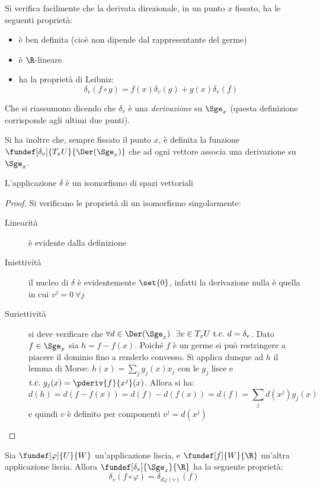 \begin{oss}
Si verifica facilmente che la derivata direzionale, in un punto $x$ fissato, ha le seguenti proprietà:
\begin{itemize}
\item è ben definita (cioè non dipende dal rappresentante del germe)
\item è $\R$-lineare
\item ha la proprietà di Leibniz:
\begin{equation*}
\delta_v(f\circ g) = f(x)\delta_v(g) + g(x)\delta_v(f)
\end{equation*}
\end{itemize}
Che si riassumono dicendo che $\delta_v$ è una \emph{derivazione} su $\Sge_x$ (questa definizione corrisponde agli ultimi due punti).
\end{oss}

Si ha inoltre che, sempre fissato il punto $x$, è definita la funzione $\fundef[\delta_v]{T_x U}{\Der(\Sge_x)}$ che ad ogni vettore associa una derivazione su $\Sge_x$.

\begin{lemma}
L'applicazione $\delta$ è un isomorfismo di spazi vettoriali
\end{lemma}
\begin{proof}
Si verificano le proprietà di un isomorfismo singolarmente:
\begin{description}
\item[Linearità] è evidente dalla definizione
\item[Iniettività] il nucleo di $\delta$ è evidentemente $\set{0}$, infatti la derivazione nulla è quella in cui $v^j = 0~ \forall j$
\item[Suriettività] si deve verificare che $\forall d\in \Der(\Sge_x)\ \ \exists v\in T_x U\ \text{t.c.}\ d = \delta_v$. Dato $f\in \Sge_x$ sia $h = f -f(x)$. Poiché $f$ è un germe si può restringere a piacere il dominio fino a renderlo convesso. Si applica dunque ad $h$ il lemma di Morse: $h(x) = \sum_j g_j(x)x_j$ con le $g_j$ lisce e $\text{t.c.}\ g_j(x) = \pderiv{f}{x^j}(x)$. Allora si ha:
\begin{equation*}
d(h) = d(f - f(x)) = d(f) - d(f(x)) = d(f) = \sum_jd(x^j)g_j(x) 
\end{equation*}
e quindi $v$ è definito per componenti $v^j = d(x^j)$
\qedhere
\end{description}
\end{proof}

\begin{oss}
Sia $\fundef[\varphi]{U}{W}$ un'applicazione liscia, e $\fundef[f]{W}{\R}$ un'altra applicazione liscia. Allora $\fundef[\delta_v]{\Sge_x}{\R}$ ha la seguente proprietà:
\begin{equation*}
\delta_v(f\circ \varphi) = \delta_{d\varphi (v)}(f)
\end{equation*}
\end{oss}

